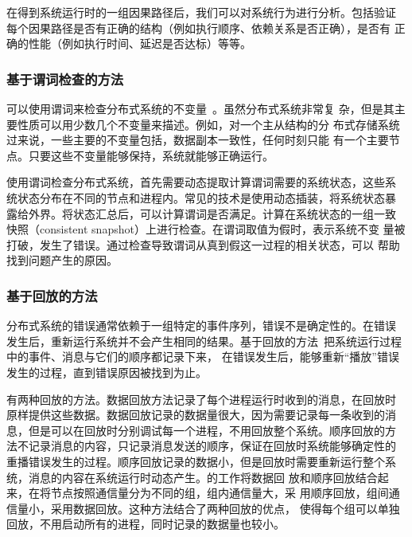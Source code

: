 在得到系统运行时的一组因果路径后，我们可以对系统行为进行分析。包括验证
每个因果路径是否有正确的结构（例如执行顺序、依赖关系是否正确），是否有
正确的性能（例如执行时间、延迟是否达标）等等。

% 


\subsubsection*{基于谓词检查的方法}

可以使用谓词来检查分布式系统的不变量~\cite{d3s}。虽然分布式系统非常复
杂，但是其主要性质可以用少数几个不变量来描述。例如，对一个主从结构的分
布式存储系统过来说，一些主要的不变量包括，数据副本一致性，任何时刻只能
有一个主要节点。只要这些不变量能够保持，系统就能够正确运行。

使用谓词检查分布式系统，首先需要动态提取计算谓词需要的系统状态，这些系
统状态分布在不同的节点和进程内。常见的技术是使用动态插装，将系统状态暴
露给外界。将状态汇总后，可以计算谓词是否满足。计算在系统状态的一组一致
快照（consistent snapshot）上进行检查。在谓词取值为假时，表示系统不变
量被打破，发生了错误。通过检查导致谓词从真到假这一过程的相关状态，可以
帮助找到问题产生的原因。

\subsubsection*{基于回放的方法}

分布式系统的错误通常依赖于一组特定的事件序列，错误不是确定性的。在错误
发生后，重新运行系统并不会产生相同的结果。基于回放的方法~\cite{liblog,
friday, r2, mpiwiz}把系统运行过程中的事件、消息与它们的顺序都记录下来，
在错误发生后，能够重新“播放”错误发生的过程，直到错误原因被找到为止。

有两种回放的方法。数据回放方法记录了每个进程运行时收到的消息，在回放时
原样提供这些数据。数据回放记录的数据量很大，因为需要记录每一条收到的消
息，但是可以在回放时分别调试每一个进程，不用回放整个系统。顺序回放的方
法不记录消息的内容，只记录消息发送的顺序，保证在回放时系统能够确定性的
重播错误发生的过程。顺序回放记录的数据小，但是回放时需要重新运行整个系
统，消息的内容在系统运行时动态产生。的工作将数据回
放和顺序回放结合起来，在将节点按照通信量分为不同的组，组内通信量大，采
用顺序回放，组间通信量小，采用数据回放。这种方法结合了两种回放的优点，
使得每个组可以单独回放，不用启动所有的进程，同时记录的数据量也较小。

